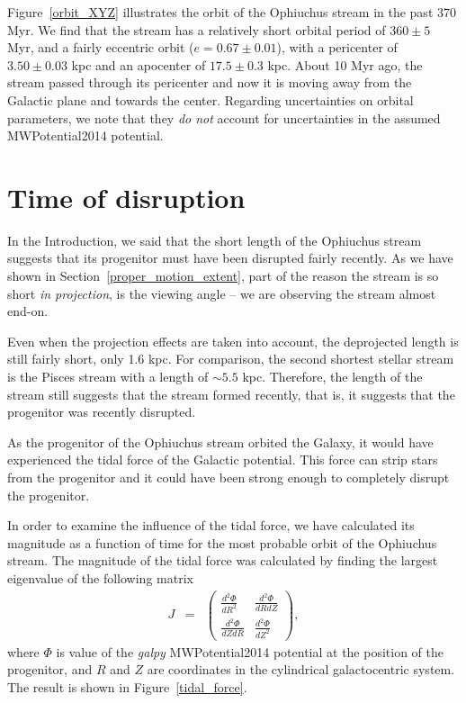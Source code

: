 \documentclass[iop]{emulateapj}
\begin{document}
Figure~\ref{orbit_XYZ} illustrates the orbit of the Ophiuchus stream in the past
370 Myr. We find that the stream has a relatively short orbital period of
$360\pm5$ Myr, and a fairly eccentric orbit ($e=0.67\pm0.01$), with a
pericenter of $3.50\pm0.03$ kpc and an apocenter of $17.5\pm0.3$ kpc. About 10
Myr ago, the stream passed through its pericenter and now it is moving away from
the Galactic plane and towards the center. Regarding uncertainties on orbital
parameters, we note that they {\em do not} account for uncertainties in the
assumed MWPotential2014 potential.

\section{Time of disruption}\label{disruption}

In the Introduction, we said that the short length of the Ophiuchus stream
suggests that its progenitor must have been disrupted fairly recently. As we
have shown in Section~\ref{proper_motion_extent}, part of the reason the stream
is so short {\em in projection}, is the viewing angle -- we are observing the
stream almost end-on.

Even when the projection effects are taken into account, the deprojected length
is still fairly short, only 1.6 kpc. For comparison, the second shortest stellar
stream is the Pisces stream \citep[also known as the Triangulum stream,
\citealt{bon12}]{pisces} with a length of $\sim5.5$ kpc. Therefore, the length
of the stream still suggests that the stream formed recently, that is, it
suggests that the progenitor was recently disrupted.

As the progenitor of the Ophiuchus stream orbited the Galaxy, it would have
experienced the tidal force of the Galactic potential. This force can strip
stars from the progenitor and it could have been strong enough to completely
disrupt the progenitor. 

In order to examine the influence of the tidal force, we have calculated its
magnitude as a function of time for the most probable orbit of the Ophiuchus
stream. The magnitude of the tidal force was calculated by finding the largest
eigenvalue of the following matrix
\begin{eqnarray}
J & = &
\left(
\begin{array}{cc}
    \frac{d^2\Phi}{dR^2} & \frac{d^2\Phi}{dRdZ} \\
    \frac{d^2\Phi}{dZdR} & \frac{d^2\Phi}{dZ^2}
\end{array}
\right),
\end{eqnarray}
where $\Phi$ is value of the {\em galpy} MWPotential2014 potential at the
position of the progenitor, and $R$ and $Z$ are coordinates in the cylindrical
galactocentric system. The result is shown in Figure~\ref{tidal_force}.
\end{document}
